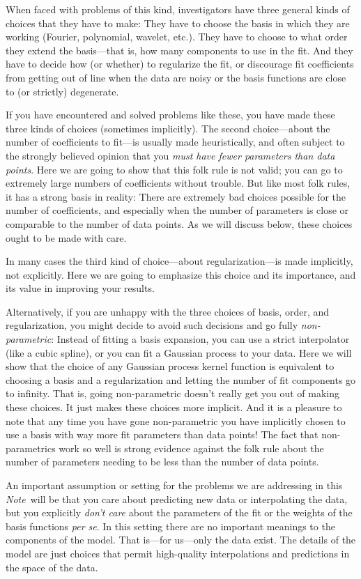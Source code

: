 \documentclass[12pt,letterpaper]{article}
\newcommand{\documentname}{\textsl{Note}}
\newcommand{\foreign}[1]{\textsl{#1}}
\begin{document}
When faced with problems of this kind, investigators have three general kinds of choices that they have to make:
They have to choose the basis in which they are working (Fourier, polynomial, wavelet, etc.).
They have to choose to what order they extend the basis---that is, how many components to use in the fit.
And they have to decide how (or whether) to regularize the fit, or discourage fit coefficients from getting out of line when the data are noisy or the basis functions are close to (or strictly) degenerate.

If you have encountered and solved problems like these, you have made these three kinds of choices (sometimes implicitly).
The second choice---about the number of coefficients to fit---is usually made heuristically, and often subject to the strongly believed opinion that you \emph{must have fewer parameters than data points}.
Here we are going to show that this folk rule is not valid; you can go to extremely large numbers of coefficients without trouble.
But like most folk rules, it has a strong basis in reality: There are extremely bad choices possible for the number of coefficients, and especially when the number of parameters is close or comparable to the number of data points.
As we will discuss below, these choices ought to be made with care.

In many cases the third kind of choice---about regularization---is made implicitly, not explicitly.
Here we are going to emphasize this choice and its importance, and its value in improving your results.

Alternatively, if you are unhappy with the three choices of basis, order, and regularization, you might decide to avoid such decisions and go fully \emph{non-parametric}:
Instead of fitting a basis expansion, you can use a strict interpolator (like a cubic spline), or you can fit a Gaussian process to your data.
Here we will show that the choice of any Gaussian process kernel function is equivalent to choosing a basis and a regularization and letting the number of fit components go to infinity.
That is, going non-parametric doesn't really get you out of making these choices.
It just makes these choices more implicit.
And it is a pleasure to note that any time you have gone non-parametric you have implicitly chosen to use a basis with way more fit parameters than data points!
The fact that non-parametrics work so well is strong evidence against the folk rule about the number of parameters needing to be less than the number of data points.

An important assumption or setting for the problems we are addressing in this \documentname\ will be that you care about predicting new data or interpolating the data, but you explicitly \emph{don't care} about the parameters of the fit or the weights of the basis functions \foreign{per se}.
In this setting there are no important meanings to the components of the model.
That is---for us---only the data exist.
The details of the model are just choices that permit high-quality interpolations and predictions in the space of the data.
\end{document}
